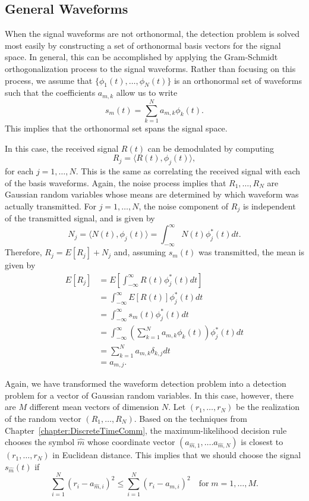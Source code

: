 \subsection{General Waveforms}

When the signal waveforms are not orthonormal, the detection problem is solved most easily by constructing a set of orthonormal basis vectors for the signal space.
In general, this can be accomplished by applying the Gram-Schmidt orthogonalization process to the signal waveforms.
Rather than focusing on this process, we assume that $\{ \phi_1 (t), \ldots , \phi_N (t) \}$ is an orthonormal set of waveforms such that the coefficients $a_{m,k}$ allow us to write
\[ s_m (t) = \sum_{k=1}^N a_{m,k} \phi_k (t). \]
This implies that the orthonormal set spans the signal space.

In this case, the received signal $R(t)$ can be demodulated by computing
\[ R_j = \langle R(t), \phi_j (t) \rangle, \]
for each $j=1,\ldots,N$.
This is the same as correlating the received signal with each of the basis waveforms.
Again, the noise process implies that $R_1 , \ldots, R_N$ are Gaussian random variables whose means are determined by which waveform was actually transmitted.
For $j=1,\ldots,N$, the noise component of $R_j$ is independent of the transmitted signal, and is given by
\[ N_j = \langle N(t), \phi_j (t) \rangle = \int_{-\infty}^{\infty} N(t) \phi_j^* (t) dt. \]
Therefore, $R_j = E[R_j] + N_j$ and, assuming $s_m (t)$ was transmitted, the mean is given by
\begin{align*}
E \left[R_j \right]
&= E \left[ \int_{-\infty}^{\infty} R(t) \phi_j^* (t) dt \right] \\
&= \int_{-\infty}^{\infty} E \left[ R(t) \right] \phi_j^* (t) dt \\
&= \int_{-\infty}^{\infty} s_m (t) \phi_j^* (t) dt \\
&= \int_{-\infty}^{\infty} \left( \sum_{k=1}^N a_{m,k} \phi_k (t) \right) \phi_j^* (t) dt \\
&= \sum_{k=1}^N a_{m,k} \delta_{k,j} dt \\
&= a_{m,j}. 
\end{align*}

Again, we have transformed the waveform detection problem into a detection problem for a vector of Gaussian random variables.
In this case, however, there are $M$ different mean vectors of dimension $N$.
Let $(r_1, \ldots, r_N)$ be the realization of the random vector $(R_1,\ldots,R_N)$.
Based on the techniques from Chapter~\ref{chapter:DiscreteTimeComm}, the maximum-likelihood decision rule chooses the symbol $\hat{m}$ whose coordinate vector $(a_{\hat{m},1},\ldots. a_{\hat{m},N})$ is closest to $(r_1,\ldots,r_N )$ in Euclidean distance.
This implies that we should choose the signal $s_{\hat{m}}(t)$ if
\[ \sum_{i=1}^N (r_i - a_{\hat{m},i})^2 \leq \sum_{i=1}^N (r_i - a_{m,i})^2 \quad \mathrm{for}\; m=1,\ldots,M. \]

